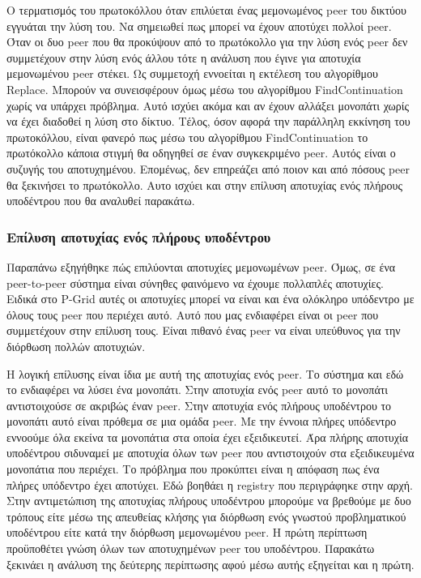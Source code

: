 Ο τερματισμός του πρωτοκόλλου όταν επιλύεται ένας μεμονωμένος peer του 
δικτύου εγγυάται την λύση του. Να σημειωθεί πως μπορεί να έχουν αποτύχει 
πολλοί peer. Όταν οι δυο peer που θα προκύψουν από το πρωτόκολλο για την λύση 
ενός peer δεν συμμετέχουν στην λύση ενός άλλου τότε η ανάλυση που έγινε για 
αποτυχία μεμονωμένου peer στέκει. Ως συμμετοχή εννοείται η εκτέλεση του 
αλγορίθμου Replace. Μπορούν να συνεισφέρουν όμως μέσω του αλγορίθμου 
FindContinuation χωρίς να υπάρχει πρόβλημα. Αυτό ισχύει ακόμα και αν έχουν 
αλλάξει μονοπάτι χωρίς να έχει διαδοθεί η λύση στο δίκτυο.
Τέλος, όσον αφορά την παράλληλη εκκίνηση του πρωτοκόλλου, είναι φανερό πως 
μέσω του αλγορίθμου FindContinuation το πρωτόκολλο κάποια στιγμή θα οδηγηθεί 
σε έναν συγκεκριμένο peer. Αυτός είναι ο συζυγής του αποτυχημένου. Επομένως, 
δεν επηρεάζει από ποιον και από πόσους peer θα ξεκινήσει το πρωτόκολλο. Αυτο 
ισχύει και στην επίλυση αποτυχίας ενός πλήρους υποδέντρου που θα αναλυθεί 
παρακάτω.

\subsubsection{Επίλυση αποτυχίας ενός πλήρους υποδέντρου}

Παραπάνω εξηγήθηκε πώς επιλύονται αποτυχίες μεμονωμένων peer. Όμως, σε ένα 
peer-to-peer σύστημα είναι σύνηθες φαινόμενο να έχουμε πολλαπλές αποτυχίες. 
Ειδικά στο P-Grid αυτές οι αποτυχίες μπορεί να είναι και ένα ολόκληρο 
υπόδεντρο με όλους τους peer που περιέχει αυτό. Αυτό που μας ενδιαφέρει 
είναι οι peer που συμμετέχουν στην επίλυση τους. Είναι πιθανό ένας peer να 
είναι υπεύθυνος για την διόρθωση πολλών αποτυχιών.

Η λογική επίλυσης είναι ίδια με αυτή της αποτυχίας ενός peer. Το σύστημα και 
εδώ το ενδιαφέρει να λύσει ένα μονοπάτι. Στην αποτυχία ενός peer αυτό το 
μονοπάτι αντιστοιχούσε σε ακριβώς έναν peer. Στην αποτυχία ενός πλήρους 
υποδέντρου το μονοπάτι αυτό είναι πρόθεμα σε μια ομάδα peer. Με την έννοια 
πλήρες υπόδεντρο εννοούμε όλα εκείνα τα μονοπάτια στα οποία έχει εξειδικευτεί. 
Άρα πλήρης αποτυχία υποδέντρου σιδυναμεί με αποτυχία όλων των peer που 
αντιστοιχούν στα εξειδικευμένα μονοπάτια που περιέχει.
Το πρόβλημα που προκύπτει είναι η απόφαση πως ένα πλήρες υπόδεντρο έχει 
αποτύχει. Εδώ βοηθάει η registry που περιγράφηκε στην αρχή. Στην αντιμετώπιση 
της αποτυχίας πλήρους υποδέντρου μπορούμε να βρεθούμε με δυο τρόπους είτε 
μέσω της απευθείας κλήσης για διόρθωση ενός γνωστού προβληματικού υποδέντρου 
είτε κατά την διόρθωση μεμονωμένου peer. Η πρώτη περίπτωση προϋποθέτει 
γνώση όλων των αποτυχημένων peer του υποδέντρου. Παρακάτω ξεκινάει η ανάλυση 
της δεύτερης περίπτωσης αφού μέσω αυτής εξηγείται και η πρώτη.

